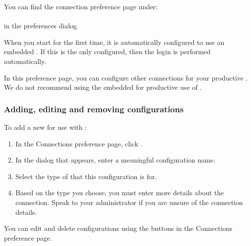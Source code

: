 


You can find the \gddb{} connection preference page under:\\
\\
in the preferences dialog.

When you start \app{} for the first time, it is automatically configured to use an embedded \gddb{}. If this is the only \gddb{} configured, then the \gddb{} login is performed automatically. 

In this preference page, you can configure other \gddb{} connections for your productive \gddb{}. We do not recommend using the embedded \gddb{} for productive use of \app{}. 


\subsubsection{Adding, editing and removing \gddb{} configurations}

To add a new \gddb{} for use with \app{}:

\begin{enumerate}
\item In the \gddb{} Connections preference page, click .
\item In the dialog that appears, enter a meaningful configuration name.
\item Select the type of \gddb{} that this configuration is for. 
\item Based on the \gddb{} type you choose, you must enter more details about the \gddb{} connection. Speak to your \gddb{} administrator if you are unsure of the connection details. 
\end{enumerate}

You can edit and delete \gddb{} configurations using the buttons in the \gddb{} Connections preference page. 
